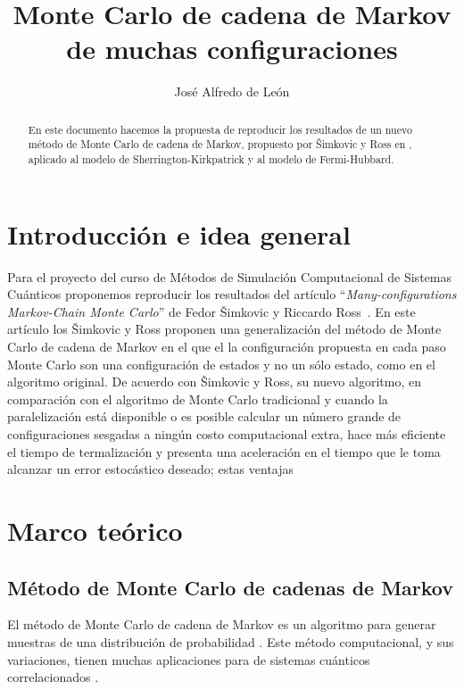 \documentclass[letterpaper,superscriptaddress,aps,pra,nolongbibliography,twocolumn,showpacs,floatfix,10pt]{revtex4-2} %
\renewcommand{\>}{\rangle}
\newcommand{\<}{\langle}
\newcommand{\Fref}[1]{Fig.~\ref{#1}}
\newcommand{\syr}{Šimkovic y Ross}
\begin{document}
\title{Monte Carlo de cadena de Markov de muchas configuraciones} 
\author{José Alfredo de León} 
\begin{abstract} %
En este documento hacemos la propuesta de reproducir 
los resultados de un nuevo método de Monte Carlo
de cadena de Markov, propuesto por Šimkovic y Ross en
\cite{simkovic2021manyconfiguration}, aplicado al modelo de Sherrington-Kirkpatrick
y al modelo de Fermi-Hubbard.
\end{abstract} %
 
\maketitle

\section{Introducción e idea general}
Para el proyecto del curso de Métodos de Simulación Computacional de Sistemas
Cuánticos proponemos reproducir los resultados del artículo ``\textit{Many-configurations
Markov-Chain Monte Carlo}'' de Fedor Šimkovic y Riccardo Ross~\citep{simkovic2021manyconfiguration}.
En este artículo los \syr{} proponen una generalización del método de Monte
Carlo de cadena de Markov en el que el la configuración propuesta en 
cada paso Monte Carlo son una configuración de estados y no un sólo 
estado, como en el algoritmo original. De acuerdo con \syr{}, su nuevo
algoritmo, en comparación con el algoritmo de Monte Carlo tradicional 
y cuando la paralelización está disponible o es posible calcular un número
grande de configuraciones sesgadas a ningún costo computacional extra,
hace más eficiente el tiempo de termalización y presenta
una aceleración en el tiempo que le toma alcanzar un error
estocástico deseado; estas ventajas 

\section{Marco teórico}
\subsection{Método de Monte Carlo de cadenas de Markov}
El método de Monte Carlo de cadena de Markov es un algoritmo para generar
muestras de una distribución de probabilidad \cite{hammersley2013monte}. Este método
computacional, y sus variaciones, tienen muchas aplicaciones para
de sistemas cuánticos correlacionados \cite{becca2017quantum}.
\end{document}
